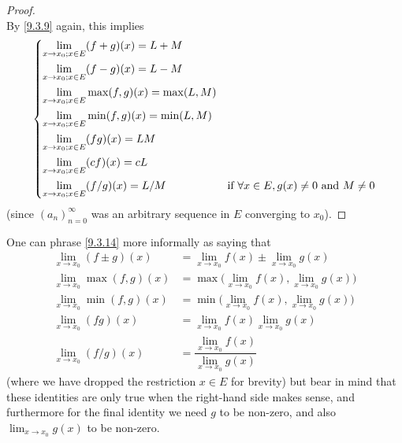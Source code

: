 \begin{proof}
\[  \]
  By \cref{9.3.9} again, this implies
  \[
    \begin{dcases}
      \lim_{x \to x_0 ; x \in E} (f + g)(x) = L + M                                                                 \\
      \lim_{x \to x_0 ; x \in E} (f - g)(x) = L - M                                                                 \\
      \lim_{x \to x_0 ; x \in E} \max(f, g)(x) = \max(L, M)                                                         \\
      \lim_{x \to x_0 ; x \in E} \min(f, g)(x) = \min(L, M)                                                         \\
      \lim_{x \to x_0 ; x \in E} (fg)(x) = LM                                                                       \\
      \lim_{x \to x_0 ; x \in E} (cf)(x) = cL                                                                       \\
      \lim_{x \to x_0 ; x \in E} (f / g)(x) = L / M & \text{if } \forall x \in E, g(x) \neq 0 \text{ and } M \neq 0
    \end{dcases}
  \]
  (since \((a_n)_{n = 0}^\infty\) was an arbitrary sequence in \(E\) converging to \(x_0\)).
\end{proof}

\begin{rmk}\label{9.3.15}
  One can phrase \cref{9.3.14} more informally as saying that
  \begin{align*}
    \lim_{x \to x_0} (f \pm g)(x)  & = \lim_{x \to x_0} f(x) \pm \lim_{x \to x_0} g(x)              \\
    \lim_{x \to x_0} \max(f, g)(x) & = \max\bigg(\lim_{x \to x_0} f(x), \lim_{x \to x_0} g(x)\bigg) \\
    \lim_{x \to x_0} \min(f, g)(x) & = \min\bigg(\lim_{x \to x_0} f(x), \lim_{x \to x_0} g(x)\bigg) \\
    \lim_{x \to x_0} (fg)(x)       & = \lim_{x \to x_0} f(x) \lim_{x \to x_0} g(x)                  \\
    \lim_{x \to x_0} (f / g)(x)    & = \dfrac{\lim_{x \to x_0} f(x)}{\lim_{x \to x_0} g(x)}
  \end{align*}
  (where we have dropped the restriction \(x \in E\) for brevity)
  but bear in mind that these identities are only true when the right-hand side makes sense, and furthermore for the final identity we need \(g\) to be non-zero, and also \(\lim_{x \to x_0} g(x)\) to be non-zero.
\end{rmk}


